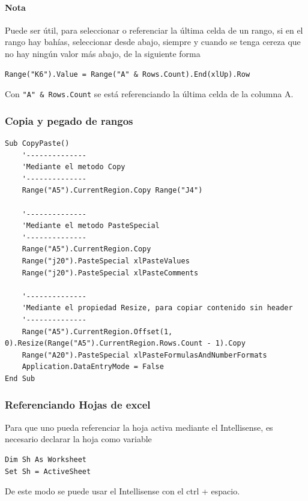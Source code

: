 \paragraph{Nota} Puede ser útil, para seleccionar o referenciar la última celda de un rango, si en el rango hay bahías, seleccionar desde abajo, siempre y cuando se tenga cereza que no hay ningún valor más abajo, de la siguiente forma

\begin{verbatim}
Range("K6").Value = Range("A" & Rows.Count).End(xlUp).Row
\end{verbatim}

Con \texttt{"A" \& Rows.Count} se está referenciando la última celda de la columna A.

\subsubsection{Copia y pegado de rangos}


\begin{verbatim}
Sub CopyPaste()
    '--------------
    'Mediante el metodo Copy
    '--------------
    Range("A5").CurrentRegion.Copy Range("J4")
    
    '--------------
    'Mediante el metodo PasteSpecial
    '--------------
    Range("A5").CurrentRegion.Copy
    Range("j20").PasteSpecial xlPasteValues
    Range("j20").PasteSpecial xlPasteComments

    '--------------
    'Mediante el propiedad Resize, para copiar contenido sin header
    '--------------
    Range("A5").CurrentRegion.Offset(1, 0).Resize(Range("A5").CurrentRegion.Rows.Count - 1).Copy
    Range("A20").PasteSpecial xlPasteFormulasAndNumberFormats
    Application.DataEntryMode = False
End Sub
\end{verbatim}

\subsubsection{Referenciando Hojas de excel}

Para que uno pueda referenciar la hoja activa mediante el Intellisense, es necesario declarar la hoja como variable

\begin{verbatim}
Dim Sh As Worksheet
Set Sh = ActiveSheet
\end{verbatim}

De este modo se puede usar el Intellisense con el ctrl + espacio. \\

